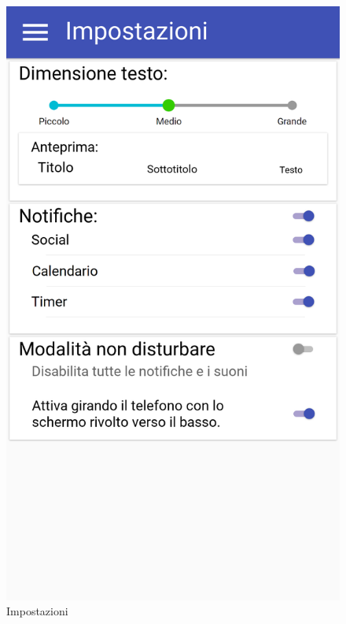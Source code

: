 \begin{figure}[H]
	\begin{minipage}{.49\textwidth}
		\includegraphics[width=\textwidth]{img/wireframe/impostazioni_non_disturbare_non_attiva.png}
		\caption{Impostazioni}
		\label{fig:impostazioni}
	\end{minipage}
	\hfill
	\begin{minipage}{.49\textwidth}

\end{minipage}
\end{figure}
